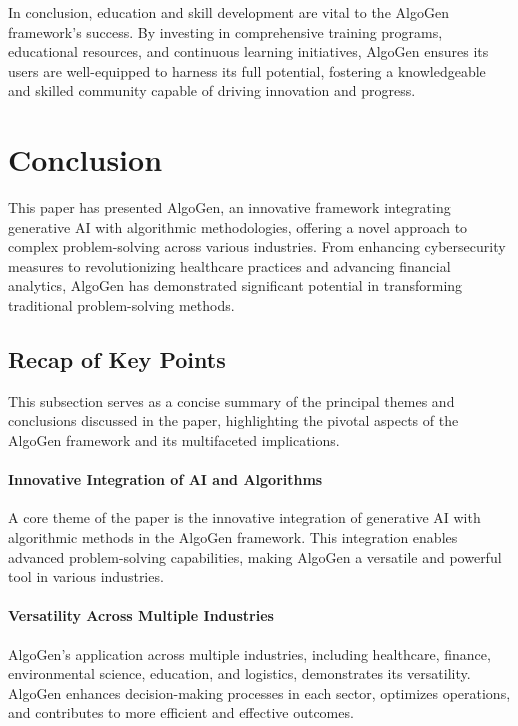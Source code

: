 \documentclass{article}
\begin{document}
In conclusion, education and skill development are vital to the AlgoGen framework's success. By investing in comprehensive training programs, educational resources, and continuous learning initiatives, AlgoGen ensures its users are well-equipped to harness its full potential, fostering a knowledgeable and skilled community capable of driving innovation and progress.



\section{Conclusion}

This paper has presented AlgoGen, an innovative framework integrating generative AI with algorithmic methodologies, offering a novel approach to complex problem-solving across various industries. From enhancing cybersecurity measures to revolutionizing healthcare practices and advancing financial analytics, AlgoGen has demonstrated significant potential in transforming traditional problem-solving methods.

\subsection{Recap of Key Points}
This subsection serves as a concise summary of the principal themes and conclusions discussed in the paper, highlighting the pivotal aspects of the AlgoGen framework and its multifaceted implications.

\paragraph{Innovative Integration of AI and Algorithms}
A core theme of the paper is the innovative integration of generative AI with algorithmic methods in the AlgoGen framework. This integration enables advanced problem-solving capabilities, making AlgoGen a versatile and powerful tool in various industries.

\paragraph{Versatility Across Multiple Industries}
AlgoGen's application across multiple industries, including healthcare, finance, environmental science, education, and logistics, demonstrates its versatility. AlgoGen enhances decision-making processes in each sector, optimizes operations, and contributes to more efficient and effective outcomes.
\end{document}
